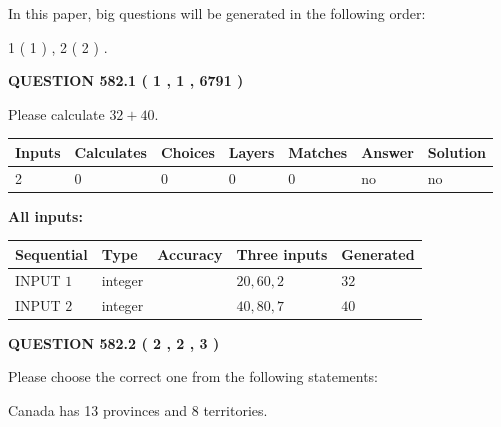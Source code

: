 \documentclass[12pt]{article}
\begin{document}
In this paper, big questions will be generated in the following order: 
   
   
   1 ( 1 )
 ,
   2 ( 2 )
 .
  
\vspace{0.2in}
  
{\textbf{\Large{QUESTION
582.1 
 ( 1 , 1 , 6791 )
}}}
  
  
 
Please calculate $ %
32 +  %
40 $.
 
 
   
   
   
   
\noindent\begin{tabular}{|l|l|l|l|l|l|l|}
 \hline
Inputs & Calculates & Choices & Layers & Matches & Answer & Solution \\ \hline
 2  & 
 0  & 
 0
  & 
 0  & 
 0  & 
  no & 
  no 
  \\ \hline
 \end{tabular}
   
   
   
   
\noindent{}
   
   
   
   
\noindent\vspace{0.1in}\hspace{-0.08in} {\textbf{\Large{All inputs: }}}
   
   
  
  
\noindent\begin{tabular}{|l|l|l|l|l|}
\hline
 Sequential & Type & Accuracy & Three inputs & Generated \\ 
\hline
 
 
  INPUT $  1 $ & integer &  & $
 20
 , 
 60
 , 
 2
 $ & $ 32 $ 
 \\  \hline  
 
 
  INPUT $  2 $ & integer &  & $
 40
 , 
 80
 , 
 7
 $ & $ 40 $ 
 \\  \hline  
 \end{tabular}
   
   
  
\vspace{0.2in}
  
{\textbf{\Large{QUESTION
582.2 
 ( 2 , 2 , 3 )
}}}
  
  
Please choose the correct one from the following statements:
 
 
Canada has  13 provinces and  8 territories.
 
\end{document}
